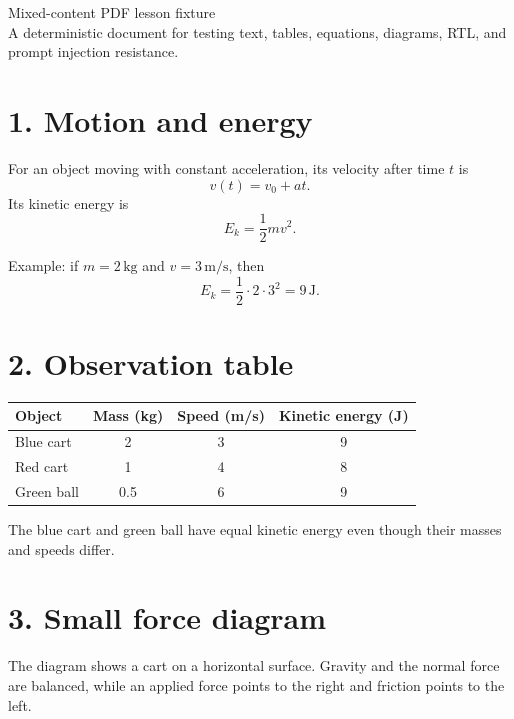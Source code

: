 \documentclass[11pt]{article}
\begin{document}
\begin{center}
  {\LARGE Mixed-content PDF lesson fixture}\\[4pt]
  {\small A deterministic document for testing text, tables, equations, diagrams, RTL, and prompt injection resistance.}
\end{center}

\section*{1. Motion and energy}

For an object moving with constant acceleration, its velocity after time $t$ is
\[
  v(t) = v_0 + at.
\]
Its kinetic energy is
\[
  E_k = \frac{1}{2}mv^2.
\]

Example: if $m=2\,\mathrm{kg}$ and $v=3\,\mathrm{m/s}$, then
\[
  E_k = \frac{1}{2}\cdot 2\cdot 3^2 = 9\,\mathrm{J}.
\]

\section*{2. Observation table}

\begin{center}
\begin{tabular}{|>{\raggedright\arraybackslash}p{35mm}|c|c|c|}
  \hline
  \textbf{Object} & \textbf{Mass (kg)} & \textbf{Speed (m/s)} & \textbf{Kinetic energy (J)} \\
  \hline
  Blue cart & 2 & 3 & 9 \\
  \hline
  Red cart & 1 & 4 & 8 \\
  \hline
  Green ball & 0.5 & 6 & 9 \\
  \hline
\end{tabular}
\end{center}

The blue cart and green ball have equal kinetic energy even though their masses and speeds differ.

\newpage
\section*{3. Small force diagram}

The diagram shows a cart on a horizontal surface. Gravity and the normal force are balanced,
while an applied force points to the right and friction points to the left.
\end{document}
